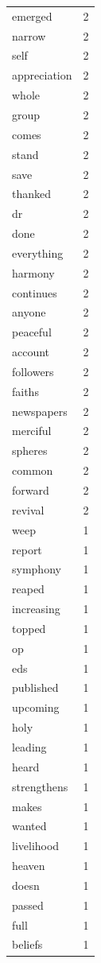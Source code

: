 \begin{tabular}{lr}
emerged & 2 \\
narrow & 2 \\
self & 2 \\
appreciation & 2 \\
whole & 2 \\
group & 2 \\
comes & 2 \\
stand & 2 \\
save & 2 \\
thanked & 2 \\
dr & 2 \\
done & 2 \\
everything & 2 \\
harmony & 2 \\
continues & 2 \\
anyone & 2 \\
peaceful & 2 \\
account & 2 \\
followers & 2 \\
faiths & 2 \\
newspapers & 2 \\
merciful & 2 \\
spheres & 2 \\
common & 2 \\
forward & 2 \\
revival & 2 \\
weep & 1 \\
report & 1 \\
symphony & 1 \\
reaped & 1 \\
increasing & 1 \\
topped & 1 \\
op & 1 \\
eds & 1 \\
published & 1 \\
upcoming & 1 \\
holy & 1 \\
leading & 1 \\
heard & 1 \\
strengthens & 1 \\
makes & 1 \\
wanted & 1 \\
livelihood & 1 \\
heaven & 1 \\
doesn & 1 \\
passed & 1 \\
full & 1 \\
beliefs & 1 \\

\end{tabular}

